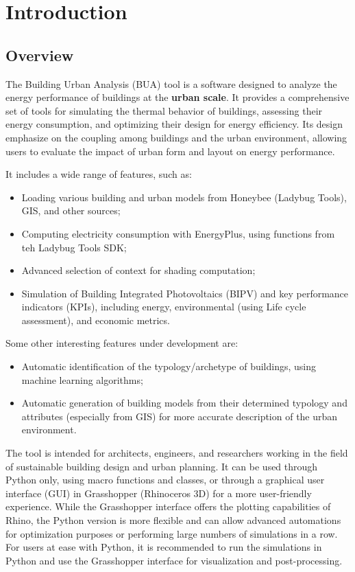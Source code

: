 \documentclass[a4paper,12pt]{article} %
\begin{document}
    \newpage


\section{Introduction}

    \subsection{Overview}
    The Building Urban Analysis (BUA) tool is a software designed to analyze the energy performance of buildings at the \textbf{urban scale}.
    It provides a comprehensive set of tools for simulating the thermal behavior of buildings, assessing their energy consumption, and optimizing their design for energy efficiency.
    Its design emphasize on the coupling among buildings and the urban environment, allowing users to evaluate the impact of urban form and layout on energy performance.

    \smallbreak
        It includes a wide range of features, such as:
    \begin{itemize}
        \item Loading various building and urban models from Honeybee (Ladybug Tools), GIS, and other sources;
        \item Computing electricity consumption with EnergyPlus, using functions from teh Ladybug Tools SDK;
        \item Advanced selection of context for shading computation;
        \item Simulation of Building Integrated Photovoltaics (BIPV) and key performance indicators (KPIs), including energy, environmental (using Life cycle assessment), and economic metrics.
    \end{itemize}

    Some other interesting features under development are:
    \begin{itemize}
        \item Automatic identification of the typology/archetype of buildings, using machine learning algorithms;
        \item Automatic generation of building models from their determined typology and attributes (especially from GIS) for more accurate description of the urban environment.
    \end{itemize}
    \smallbreak
    The tool is intended for architects, engineers, and researchers working in the field of sustainable building design and urban planning.
    It can be used through Python only, using macro functions and classes, or through a graphical user interface (GUI) in Grasshopper (Rhinoceros 3D) for a more user-friendly experience.
    While the Grasshopper interface offers the plotting capabilities of Rhino, the Python version is more flexible and can allow advanced automations for optimization purposes or performing large numbers of simulations in a row.
    For users at ease with Python, it is recommended to run the simulations in Python and use the Grasshopper interface for visualization and post-processing.
\end{document}
